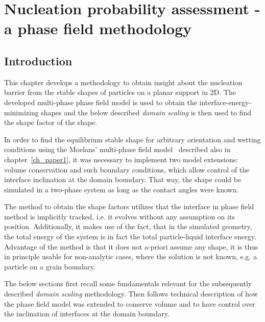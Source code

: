 \chapter{Nucleation probability assessment - a phase field methodology}\label{ch_NPA_PF_methodology}

\section{Introduction}
This chapter develops a methodology to obtain insight about the nucleation barrier from the stable shapes of particles on a planar support in 2D. The developed multi-phase phase field model is used to obtain the interface-energy-minimizing shapes and the below described \textit{domain scaling} is then used to find the shape factor of the shape. 

In order to find the equilibrium stable shape for arbitrary orientation and wetting conditions using the Moelans' multi-phase field model~\cite{Moelans2008} described also in chapter~\ref{ch_paper1}, it was necessary to implement two model extensions: volume conservation and such boundary conditions, which allow control of the interface inclination at the domain boundary. That way, the shape could be simulated in a two-phase system as long as the contact angles were known.


The method to obtain the shape factors utilizes that the interface in phase field method is implicitly tracked, i.e. it evolves without any assumption on its position. Additionally, it makes use of the fact, that in the simulated geometry, the total energy of the system is in fact the total particle-liquid interface energy. Advantage of the method is that it does not a-priori assume any shape, it is thus in principle usable for non-analytic cases, where the solution is not known, e.g. a particle on a grain boundary.

The below sections first recall some fundamentals relevant for the subsequently described \textit{domain scaling} methodology. Then follows technical description of how the phase field model was extended to conserve volume and to have control over the inclination of interfaces at the domain boundary.

